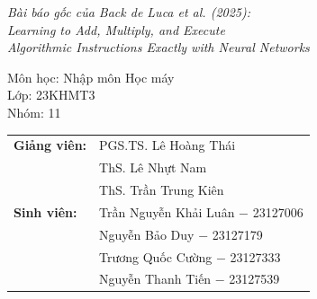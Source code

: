 \begin{center}
        {\fontsize{12pt}{14pt}\selectfont
        \parbox{0.88\textwidth}{\centering\itshape
            Bài báo gốc của Back de Luca et al. (2025):\\
            Learning to Add, Multiply, and Execute\\
            Algorithmic Instructions Exactly with Neural Networks
        }}

        \vspace{0.8cm}
        {\fontsize{13pt}{0pt}\selectfont Môn học: Nhập môn Học máy}\\\vspace{0.2cm}
                {\fontsize{13pt}{0pt}\selectfont Lớp: 23KHMT3}\vspace{0.2cm} \\
        {\fontsize{13pt}{0pt}\selectfont Nhóm: 11}\vspace{0.2cm} 

        \vspace{1cm}

        \begin{tabular}{l l}
            \fontsize{13pt}{0pt}\selectfont \textbf{Giảng viên:} & \fontsize{13pt}{0pt}\selectfont PGS.TS. Lê Hoàng Thái \\[6pt]
            & \fontsize{13pt}{0pt}\selectfont ThS. Lê Nhựt Nam \\[6pt]
            & \fontsize{13pt}{0pt}\selectfont ThS. Trần Trung Kiên \\[12pt]
            \fontsize{13pt}{0pt}\selectfont \textbf{Sinh viên:} & \fontsize{13pt}{0pt}\selectfont Trần Nguyễn Khải Luân $-$ 23127006 \\[6pt]
            & \fontsize{13pt}{0pt}\selectfont Nguyễn Bảo Duy $-$ 23127179 \\[6pt]
            & \fontsize{13pt}{0pt}\selectfont Trương Quốc Cường $-$ 23127333 \\[6pt]
            & \fontsize{13pt}{0pt}\selectfont Nguyễn Thanh Tiến $-$ 23127539 \\
        \end{tabular}

    \end{center}